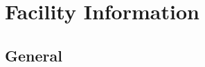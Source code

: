 \section{Facility Information}


\subsection{General}


\DTLsetseparator{///}

\begin{table}[htbp]
\centering
\begin{tabular}
 

 \renewcommand{\dtlheaderformat}{ \rowcolor{lhitabletitle}\color{white}\normalfont\bfseries}
 
\end{tabular}
\end{table}
